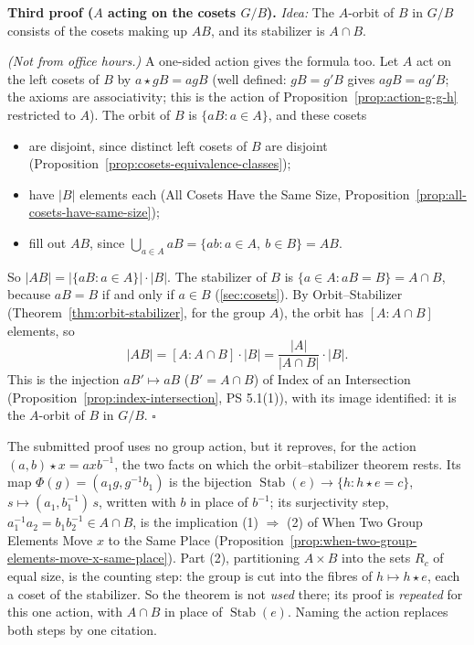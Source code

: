 \documentclass[11pt]{report}
\renewenvironment{proof}[1][Proof]{\noindent\textbf{#1.} }{\hfill$\square$\par\vspace{5pt}}
\begin{document}
\begin{proof}[Third proof ($A$ acting on the cosets $G/B$)]
\textit{Idea:} The $A$-orbit of $B$ in $G/B$ consists of the cosets making up $AB$, and its stabilizer is $A \cap B$.\par
\textit{(Not from office hours.)} A one-sided action gives the formula too. Let $A$ act on the left cosets of $B$ by $a \star gB = agB$ (well defined: $gB = g'B$ gives $agB = ag'B$; the axioms are associativity; this is the action of Proposition~\ref{prop:action-g-g-h} restricted to $A$). The orbit of $B$ is $\{aB : a \in A\}$, and these cosets
\begin{itemize}[nosep]
    \item are disjoint, since distinct left cosets of $B$ are disjoint (Proposition~\ref{prop:cosets-equivalence-classes});
    \item have $|B|$ elements each (All Cosets Have the Same Size, Proposition~\ref{prop:all-cosets-have-same-size});
    \item fill out $AB$, since $\bigcup_{a \in A} aB = \{ab : a \in A,\ b \in B\} = AB$.
\end{itemize}
So $|AB| = |\{aB : a \in A\}| \cdot |B|$. The stabilizer of $B$ is $\{a \in A : aB = B\} = A \cap B$, because $aB = B$ if and only if $a \in B$ (\ref{sec:cosets}). By Orbit--Stabilizer (Theorem~\ref{thm:orbit-stabilizer}, for the group $A$), the orbit has $[A : A \cap B]$ elements, so
\[ |AB| = [A : A \cap B] \cdot |B| = \frac{|A|}{|A \cap B|} \cdot |B|. \]
This is the injection $aB' \mapsto aB$ ($B' = A \cap B$) of Index of an Intersection (Proposition~\ref{prop:index-intersection}, PS 5.1(1)), with its image identified: it is the $A$-orbit of $B$ in $G/B$.
\end{proof}

\begin{rembox}\label{rem:product-formula-is-orbit-stabilizer}
The submitted proof uses no group action, but it reproves, for the action $(a, b) \star x = axb^{-1}$, the two facts on which the orbit--stabilizer theorem rests. Its map $\Phi(g) = (a_1g, g^{-1}b_1)$ is the bijection $\operatorname{Stab}(e) \to \{h : h \star e = c\}$, $s \mapsto (a_1, b_1^{-1})\,s$, written with $b$ in place of $b^{-1}$; its surjectivity step, $a_1^{-1}a_2 = b_1b_2^{-1} \in A \cap B$, is the implication (1) $\Rightarrow$ (2) of When Two Group Elements Move $x$ to the Same Place (Proposition~\ref{prop:when-two-group-elements-move-x-same-place}). Part (2), partitioning $A \times B$ into the sets $R_c$ of equal size, is the counting step: the group is cut into the fibres of $h \mapsto h \star e$, each a coset of the stabilizer. So the theorem is not \emph{used} there; its proof is \emph{repeated} for this one action, with $A \cap B$ in place of $\operatorname{Stab}(e)$. Naming the action replaces both steps by one citation.
\end{rembox}
\end{document}
